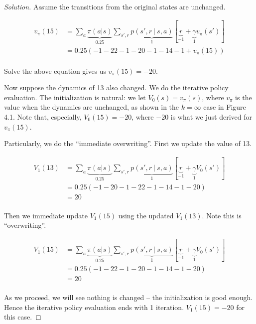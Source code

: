 \documentclass[oneside,11pt]{article}
\theoremstyle{definition}
\newcommand{\vpi}{v_{\pi}}
\newcommand\givenbase[1][]{\:#1\lvert\:}
\let\given\givenbase
\newenvironment{solution}
{\renewcommand\qedsymbol{$\blacksquare$}\begin{proof}[Solution]} {\end{proof}}
\begin{document}
\begin{shaded}
\begin{solution} 

Assume the transitions from the original states are unchanged. 

\begin{equation*} %
\begin{split}
\vpi(15) & = \sum_a \underbrace{\pi(a|s)}_{0.25} \sum_{s', r} \underbrace{p(s' , r \given s,a)}_{1} [\underbrace{r}_{-1} + \underbrace{\gamma}_{1} \vpi(s')] \\
& =  0.25 (-1 - 22 - 1 - 20 - 1 -14 - 1 + \vpi(15))\\
\end{split}
\end{equation*}

Solve the above equation gives us $\vpi(15) = -20$.

Now suppose the dynamics of 13 also changed. We do the iterative policy evaluation. The initialization is natural: we let $V_0(s) = \vpi(s)$, where $\vpi$ is the value when the dynamics are unchanged, as shown in the $k = \infty$ case in Figure 4.1. Note that, especially, $V_0(15) = -20$, where $-20$ is what we just derived for $\vpi(15)$.

Particularly, we do the ``immediate overwriting''. First we update the value of 13. 

\begin{equation*} %
\begin{split}
V_1(13) & = \sum_a \underbrace{\pi(a|s)}_{0.25} \sum_{s', r} \underbrace{p(s' , r \given s,a)}_{1} [\underbrace{r}_{-1} + \underbrace{\gamma}_{1} V_0(s')] \\
& =  0.25 (-1 - 20 - 1 - 22 - 1 -14 - 1 -20 )\\
& =  20 \\
\end{split}
\end{equation*}

Then we immediate update $V_1(15)$ using the updated $V_1(13)$. Note this is ``overwriting''.

\begin{equation*} %
\begin{split}
V_1(15) & = \sum_a \underbrace{\pi(a|s)}_{0.25} \sum_{s', r} \underbrace{p(s' , r \given s,a)}_{1} [\underbrace{r}_{-1} + \underbrace{\gamma}_{1} V_0(s')] \\
& =  0.25 (-1 - 22 - 1 - 20 - 1 -14 - 1 - 20)\\
& =  20 \\
\end{split}
\end{equation*}

As we proceed, we will see nothing is changed -- the initialization is good enough. Hence the iterative policy evaluation ends with 1 iteration. $V_1(15)  = -20$ for this case.


\end{solution} 
\end{shaded}
\end{document}

